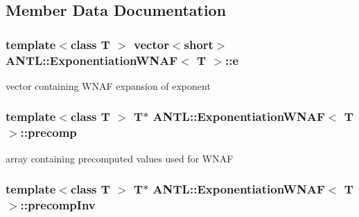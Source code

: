 \subsection{Member Data Documentation}
\hypertarget{classANTL_1_1ExponentiationWNAF_af0a23c1341f752e8f36ba56b38d9d33b}{
\subsubsection[{e}]{\setlength{\rightskip}{0pt plus 5cm}template$<$class T $>$ vector$<$short$>$ {\bf A\-N\-T\-L\-::\-Exponentiation\-W\-N\-A\-F}$<$ T $>$\-::e\hspace{0.3cm}{\ttfamily [protected]}}}\label{classANTL_1_1ExponentiationWNAF_af0a23c1341f752e8f36ba56b38d9d33b}
vector containing W\-N\-A\-F expansion of exponent \hypertarget{classANTL_1_1ExponentiationWNAF_a8d2b1e59c758d66f2e8a1bc0d2cb3f50}{
\subsubsection[{precomp}]{\setlength{\rightskip}{0pt plus 5cm}template$<$class T $>$ T$\ast$ {\bf A\-N\-T\-L\-::\-Exponentiation\-W\-N\-A\-F}$<$ T $>$\-::precomp\hspace{0.3cm}{\ttfamily [protected]}}}\label{classANTL_1_1ExponentiationWNAF_a8d2b1e59c758d66f2e8a1bc0d2cb3f50}
array containing precomputed values used for W\-N\-A\-F \hypertarget{classANTL_1_1ExponentiationWNAF_aebe9720da10b933ec0fc19f510ca18bc}{
\subsubsection[{precomp\-Inv}]{\setlength{\rightskip}{0pt plus 5cm}template$<$class T $>$ T$\ast$ {\bf A\-N\-T\-L\-::\-Exponentiation\-W\-N\-A\-F}$<$ T $>$\-::precomp\-Inv\hspace{0.3cm}{\ttfamily [protected]}}}\label{classANTL_1_1ExponentiationWNAF_aebe9720da10b933ec0fc19f510ca18bc}
